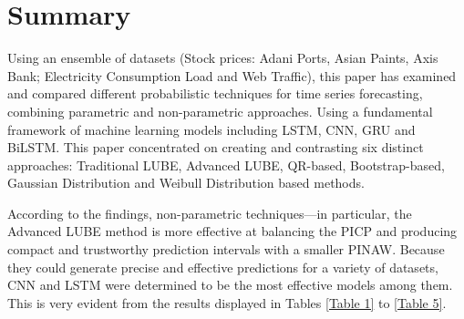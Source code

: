 \begin{table}[!t] %
\centering
\caption{Comparative Performance of Gaussian Distribution and Weibull Distribution based Methods on Web Traffic dataset.}
\vspace{0.5cm}
\renewcommand{\arraystretch}{1} %
\label{Table 10}
\end{table}
\clearpage

\section{ Summary}
Using an ensemble of datasets (Stock prices: Adani Ports, Asian Paints, Axis Bank; Electricity Consumption Load and Web Traffic), this paper has examined and compared different probabilistic techniques for time series forecasting, combining parametric and non-parametric approaches. Using a fundamental framework of machine learning models including LSTM, CNN, GRU and BiLSTM. This paper concentrated on creating and contrasting six distinct approaches: Traditional LUBE, Advanced LUBE, QR-based, Bootstrap-based, Gaussian Distribution and Weibull Distribution based methods.

According to the findings, non-parametric techniques—in particular, the Advanced LUBE method is more effective at balancing the PICP and producing compact and trustworthy prediction intervals with a smaller PINAW. Because they could generate precise and effective predictions for a variety of datasets, CNN and LSTM were determined to be the most effective models among them. This is very evident from the results displayed in Tables \ref{Table 1} to \ref{Table 5}.


